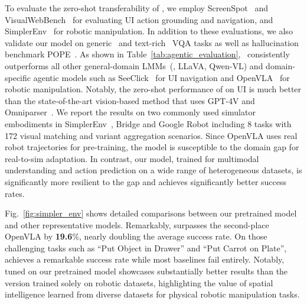 To evaluate the zero-shot transferability of \magma,  we employ ScreenSpot~\cite{seeclick} and VisualWebBench~\cite{liu2024visualwebbench} for evaluating UI action grounding and navigation, and SimplerEnv~\cite{li24simpler} for robotic manipulation. In addition to these evaluations, we also validate our model on generic~\cite{goyal2017vqav2} and text-rich~\cite{singh2019textvqa} VQA tasks as well as hallucination benchmark POPE~\cite{li2023pope}. As shown in Table~\ref{tab:agentic_evaluation}, \magma~consistently outperforms all other general-domain LMMs~(\eg, LLaVA, Qwen-VL) and domain-specific agentic models such as SeeClick~\cite{seeclick} for UI navigation and OpenVLA~\cite{kim2024openvla} for robotic manipulation. Notably, the zero-shot performance of \magma on UI is much better than the state-of-the-art vision-based method that uses GPT-4V and Omniparser~\cite{lu2024omniparserpurevisionbased}. 
We report the results on two commonly used simulator embodiments in SimplerEnv~\cite{li24simpler}, Bridge and Google Robot including 8 tasks with 172 visual matching and variant aggregation scenarios. 
Since OpenVLA uses real robot trajectories for pre-training, the model is susceptible to the domain gap for real-to-sim adaptation. In contrast, our \magma model, trained for multimodal understanding and action prediction on a wide range of heterogeneous datasets, is significantly more resilient to the gap and achieves significantly better success rates. 


Fig.~\ref{fig:simpler_env} shows detailed comparisons between our pretrained \magma model and other representative models. Remarkably, \magma surpasses the second-place OpenVLA by \textbf{19.6}\%, nearly doubling the average success rate. On those challenging tasks such as ``Put Object in Drawer'' and ``Put Carrot on Plate'', \magma achieves a remarkable success rate while most baselines fail entirely. Notably, \magma tuned on our pretrained model showcases substantially better results than the version trained solely on robotic datasets, highlighting the value of spatial intelligence learned from diverse datasets for physical robotic manipulation tasks.

